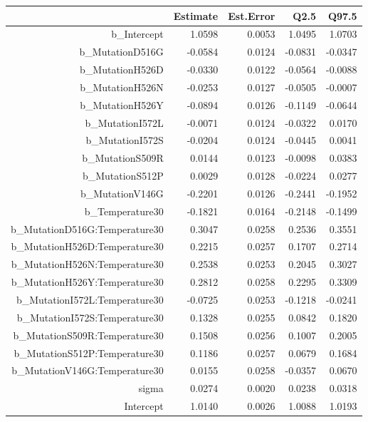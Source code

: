 \begin{table}[ht]
\centering
\begin{tabular}{rrrrr}
  \hline
 & Estimate & Est.Error & Q2.5 & Q97.5 \\ 
  \hline
b\_Intercept & 1.0598 & 0.0053 & 1.0495 & 1.0703 \\ 
  b\_MutationD516G & -0.0584 & 0.0124 & -0.0831 & -0.0347 \\ 
  b\_MutationH526D & -0.0330 & 0.0122 & -0.0564 & -0.0088 \\ 
  b\_MutationH526N & -0.0253 & 0.0127 & -0.0505 & -0.0007 \\ 
  b\_MutationH526Y & -0.0894 & 0.0126 & -0.1149 & -0.0644 \\ 
  b\_MutationI572L & -0.0071 & 0.0124 & -0.0322 & 0.0170 \\ 
  b\_MutationI572S & -0.0204 & 0.0124 & -0.0445 & 0.0041 \\ 
  b\_MutationS509R & 0.0144 & 0.0123 & -0.0098 & 0.0383 \\ 
  b\_MutationS512P & 0.0029 & 0.0128 & -0.0224 & 0.0277 \\ 
  b\_MutationV146G & -0.2201 & 0.0126 & -0.2441 & -0.1952 \\ 
  b\_Temperature30 & -0.1821 & 0.0164 & -0.2148 & -0.1499 \\ 
  b\_MutationD516G:Temperature30 & 0.3047 & 0.0258 & 0.2536 & 0.3551 \\ 
  b\_MutationH526D:Temperature30 & 0.2215 & 0.0257 & 0.1707 & 0.2714 \\ 
  b\_MutationH526N:Temperature30 & 0.2538 & 0.0253 & 0.2045 & 0.3027 \\ 
  b\_MutationH526Y:Temperature30 & 0.2812 & 0.0258 & 0.2295 & 0.3309 \\ 
  b\_MutationI572L:Temperature30 & -0.0725 & 0.0253 & -0.1218 & -0.0241 \\ 
  b\_MutationI572S:Temperature30 & 0.1328 & 0.0255 & 0.0842 & 0.1820 \\ 
  b\_MutationS509R:Temperature30 & 0.1508 & 0.0256 & 0.1007 & 0.2005 \\ 
  b\_MutationS512P:Temperature30 & 0.1186 & 0.0257 & 0.0679 & 0.1684 \\ 
  b\_MutationV146G:Temperature30 & 0.0155 & 0.0258 & -0.0357 & 0.0670 \\ 
  sigma & 0.0274 & 0.0020 & 0.0238 & 0.0318 \\ 
  Intercept & 1.0140 & 0.0026 & 1.0088 & 1.0193 \\ 

\end{tabular}
\end{table}
